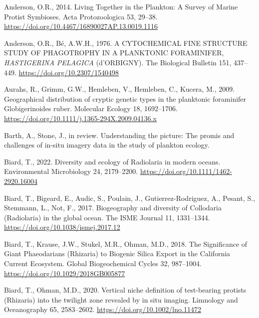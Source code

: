 \documentclass[
  letterpaper,
  DIV=11,
  numbers=noendperiod]{scrartcl}
\newlength{\cslhangindent}
\newlength{\cslentryspacingunit} %
\newenvironment{CSLReferences}[2] %
 {%
  \setlength{\parindent}{0pt}
  \ifodd #1
  \let\oldpar\par
  \def\par{\hangindent=\cslhangindent\oldpar}
  \fi
  \setlength{\parskip}{#2\cslentryspacingunit}
 }%
 {}
\begin{document}
\hypertarget{refs}{}
\begin{CSLReferences}{1}{0}
\leavevmode{}%
Anderson, O.R., 2014. Living Together in the Plankton: A Survey of
Marine Protist Symbioses. Acta Protozoologica 53, 29--38.
\url{https://doi.org/10.4467/16890027AP.13.0019.1116}

\leavevmode{}%
Anderson, O.R., Bé, A.W.H., 1976. A CYTOCHEMICAL FINE STRUCTURE STUDY OF
PHAGOTROPHY IN A PLANKTONIC FORAMINIFER, {\emph{HASTIGERINA PELAGICA}}
(d'ORBIGNY). The Biological Bulletin 151, 437--449.
\url{https://doi.org/10.2307/1540498}

\leavevmode{}%
Aurahs, R., Grimm, G.W., Hemleben, V., Hemleben, C., Kucera, M., 2009.
Geographical distribution of cryptic genetic types in the planktonic
foraminifer Globigerinoides ruber. Molecular Ecology 18, 1692--1706.
\url{https://doi.org/10.1111/j.1365-294X.2009.04136.x}

\leavevmode{}%
Barth, A., Stone, J., in review. Understanding the picture: The promis
and challenges of in-situ imagery data in the study of plankton ecology.

\leavevmode{}%
Biard, T., 2022. Diversity and ecology of Radiolaria in modern oceans.
Environmental Microbiology 24, 2179--2200.
\url{https://doi.org/10.1111/1462-2920.16004}

\leavevmode{}%
Biard, T., Bigeard, E., Audic, S., Poulain, J., Gutierrez-Rodriguez, A.,
Pesant, S., Stemmann, L., Not, F., 2017. Biogeography and diversity of
Collodaria (Radiolaria) in the global ocean. The ISME Journal 11,
1331--1344. \url{https://doi.org/10.1038/ismej.2017.12}

\leavevmode{}%
Biard, T., Krause, J.W., Stukel, M.R., Ohman, M.D., 2018. The
Significance of Giant Phaeodarians (Rhizaria) to Biogenic Silica Export
in the California Current Ecosystem. Global Biogeochemical Cycles 32,
987--1004. \url{https://doi.org/10.1029/2018GB005877}

\leavevmode{}%
Biard, T., Ohman, M.D., 2020. Vertical niche definition of test-bearing
protists (Rhizaria) into the twilight zone revealed by in situ imaging.
Limnology and Oceanography 65, 2583--2602.
\url{https://doi.org/10.1002/lno.11472}


\end{CSLReferences}
\end{document}
